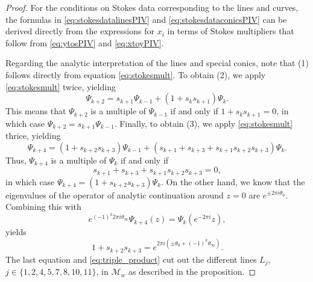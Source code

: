 \documentclass[a4paper,reqno]{amsart}
\numberwithin{equation}{section}
\numberwithin{equation}{section}
\begin{document}
\begin{proof}
    For the conditions on Stokes data corresponding to the lines and curves, the formulas in \eqref{eq:stokesdatalinesPIV} and \eqref{eq:stokesdataconicsPIV} can be derived directly from the expressions for $x_i$ in terms of Stokes multipliers that follow from \eqref{eq:ytosPIV} and \eqref{eq:xtoyPIV}. 

    Regarding the analytic interpretation of the lines and special conics, note that (1) follows directly from equation \eqref{eq:stokesmult}.
    To obtain (2), we apply \eqref{eq:stokesmult} twice, yielding
    \begin{equation*}
        \Psi_{k+2}=s_{k+1}\Psi_{k-1}+(1+s_k s_{k+1})\Psi_k.
    \end{equation*}
This means that $\Psi_{k+2}$ is a multiple of  $\Psi_{k-1}$ if and only if $1+s_k s_{k+1}=0$, in which case $\Psi_{k+2}=s_{k+1}\Psi_{k-1}$.
Finally, to obtain (3), we apply \eqref{eq:stokesmult} thrice, yielding
    \begin{equation*}
        \Psi_{k+4}=(1+s_{k+2}s_{k+3})\Psi_{k-1}+(s_{k+1}+s_{k+3}+s_{k+1}s_{k+2}s_{k+3})\Psi_k.
    \end{equation*}
Thus, $\Psi_{k+4}$ is a multiple of  $\Psi_k$ if and only if 
\begin{equation}\label{eq:triple_product}
   s_{k+1}+s_{k+3}+s_{k+1}s_{k+2}s_{k+3}=0,
\end{equation}
in which case $\Psi_{k+4}=(1+s_{k+2}s_{k+3})\Psi_{k}$. On the other hand, we know that the eigenvalues of the operator of analytic continuation around $z=0$ are $e^{\pm 2\pi i\theta_0}$. Combining this with
\begin{equation*}
   e^{(-1)^k2\pi i\theta_\infty} \Psi_{k+4}(z)=\Psi_{k}(e^{-2\pi i}z),
\end{equation*}
yields $$1+s_{k+2}s_{k+3}=e^{2\pi i(\pm \theta_0+(-1)^k\theta_\infty)}.$$
The last equation and \eqref{eq:triple_product} cut out the different lines $L_j$, $j\in\{1,2,4,5,7,8,10,11\}$, in $\mathcal{M}_w$ as described in the proposition. 
\end{proof}
\end{document}
